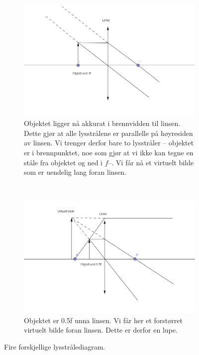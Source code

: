 \documentclass[a4paper,norsk, 10pt]{article}
\begin{document}
\begin{figure}[H]
\begin{subfigure}[b]{0.47\textwidth}
        \includegraphics[width=\textwidth]{1f.png}
        \caption{Objektet ligger nå akkurat i brennvidden til linsen. Dette gjør at alle lysstrålene er parallelle på høyresiden av linsen. Vi trenger derfor bare to lysstråler -- objektet er i brennpunktet, noe som gjør at vi ikke kan tegne en ståle fra objektet og ned i $f$--. Vi får nå et virtuelt bilde som er uendelig lang foran linsen.}
        \label{fig:1f}
    \end{subfigure}
     ~ 
    \begin{subfigure}[b]{0.47\textwidth}
        \includegraphics[width=\textwidth]{05f.png}
        \caption{Objektet er 0.5f unna linsen. Vi får her et forstørret virtuelt bilde foran linsen. Dette er derfor en lupe.}
        \label{fig:05f}
    \end{subfigure}
    \caption{Fire forskjellige lysstrålediagram.}\label{fig:diagram}
\end{figure}
\end{document}
